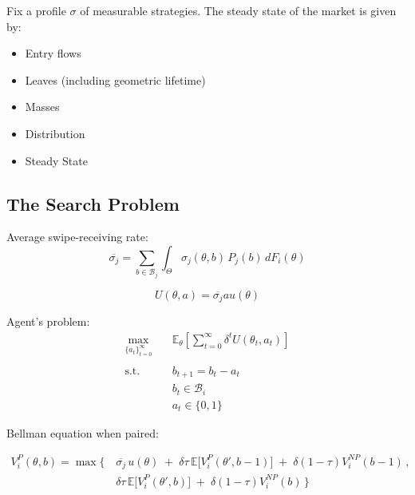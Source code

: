 \begin{theorem}
    Fix a profile $\sigma$ of measurable strategies. The steady state of the market is given by:
\end{theorem}

\begin{itemize}
    \item Entry flows
    \item Leaves (including geometric lifetime)
    \item Masses
    \item Distribution
    \item Steady State
\end{itemize}
\subsection{The Search Problem}
Average swipe-receiving rate:
\begin{equation}
    \overline{\sigma_j} = \sum_{b\in \mathcal{B}_j}\int_{\Theta} \sigma_j(\theta,b)\,{P}_j(b)\,dF_i(\theta)
\end{equation} 

\begin{equation}
    U(\theta, a)=\overline{\sigma_j}au(\theta)
\end{equation}

Agent's problem:
\begin{equation}
    \begin{aligned} 
        \max_{\{a_t\}^\infty_{t=0}} \quad & \mathbb{E}_{\theta}\left[\sum^\infty_{t=0} \delta^{t} U(\theta_t,a_t)\right]\\\\ 
        \textrm{s.t.} \quad & b_{t+1}  = b_t -a_t \\
        & b_t\in \mathcal{B}_i \\
        & a_t\in \{0,1\}  
    \end{aligned}
\end{equation}

Bellman equation when paired:

\begin{equation}
    \begin{split}
    V^{P}_i(\theta,b) = \max \Big\{\, & \overline{\sigma_j}\, u(\theta) \;+\; \delta \tau \,\mathbb{E}\Big[V^P_i(\theta', b-1)\Big] \;+\; \delta (1-\tau)V^{NP}_i(b-1)\,,\\  & \delta \tau \,\mathbb{E}\Big[ V^P_i(\theta', b)\Big] \;+\; \delta (1-\tau) V^{NP}_i(b)\, \Big\}  
    \end{split}
\end{equation}

